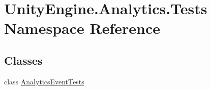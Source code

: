 \hypertarget{namespace_unity_engine_1_1_analytics_1_1_tests}{}\section{Unity\+Engine.\+Analytics.\+Tests Namespace Reference}
\label{namespace_unity_engine_1_1_analytics_1_1_tests}
\subsection*{Classes}
\begin{DoxyCompactItemize}
\item 
class \mbox{\hyperlink{class_unity_engine_1_1_analytics_1_1_tests_1_1_analytics_event_tests}{Analytics\+Event\+Tests}}
\end{DoxyCompactItemize}
